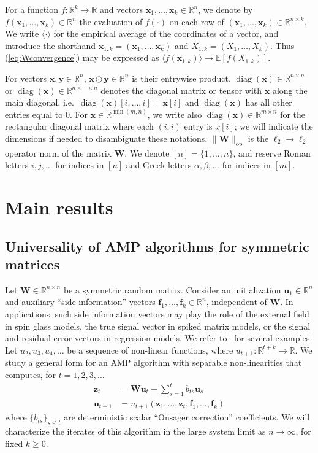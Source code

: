 \documentclass[10pt,reqno]{amsart}
\def\u{\mathbf{u}}
\def\x{\mathbf{x}}
\def\y{\mathbf{y}}
\def\z{\mathbf{z}}
\def\f{\mathbf{f}}
\def\W{\mathbf{W}}
\def\E{\mathbb{E}}
\def\R{\mathbb{R}}
\def\diag{\operatorname{diag}}
\def\op{\mathrm{op}}
\begin{document}
For a function $f:\R^k \to \R$ and vectors $\x_1,\ldots,\x_k \in
\R^n$, we denote by $f(\x_1,\ldots,\x_k) \in \R^n$ the evaluation of $f(\cdot)$
on each row of $(\x_1,\ldots,\x_k) \in \R^{n \times k}$.
We write $\langle \cdot \rangle$ for the
empirical average of the coordinates of a vector, and introduce the shorthand
$\x_{1:k}=(\x_1,\ldots,\x_k)$ and $X_{1:k}=(X_1,\ldots,X_k)$. Thus
(\ref{eq:Wconvergence}) may be expressed as
$\langle f(\x_{1:k}) \rangle \to \E[f(X_{1:k})]$.

For vectors $\x,\y \in \R^n$, $\x \odot \y \in \R^n$ is their entrywise
product. $\diag(\x) \in \R^{n \times n}$ or $\diag(\x) \in \R^{n \times \cdots
\times n}$ denotes the diagonal matrix or tensor with $\x$ along the main
diagonal, i.e.\ $\diag(\x)[i,\ldots,i] = \x[i]$ and $\diag(\x)$ has all
other entries equal to 0.
For $\x \in \R^{\min(m,n)}$, we write also $\diag(\x) \in
\R^{m \times n}$ for the rectangular diagonal matrix where each $(i,i)$ entry
is $x[i]$; we will indicate the dimensions if needed to disambiguate these
notations. $\|\W\|_\op$ is the $\ell_2 \to \ell_2$ operator norm of the matrix
$\W$. We denote $[n]=\{1,\ldots,n\}$, and reserve Roman letters
$i,j,\ldots$ for indices in $[n]$ and Greek letters
$\alpha,\beta,\ldots$ for indices in $[m]$.


\section{Main results}\label{sec:result}

\subsection{Universality of AMP algorithms for symmetric matrices}\label{sec:result_sym}

Let $\W \in \R^{n \times n}$ be a symmetric random matrix. Consider an
initialization $\u_1 \in \R^n$ and auxiliary ``side information'' vectors
$\f_1,\ldots,\f_k \in \R^n$, independent of $\W$. In applications, such side information
vectors may play the role of the external
field in spin glass models, the true signal vector in spiked matrix models, or
the signal and residual error vectors in regression models. We refer
to~\cite{bayati2011dynamics,rangan2011generalized,rangan2012iterative} for
several examples. Let $u_2,u_3,u_4,\ldots$ be a
sequence of non-linear functions, where $u_{t+1}:\R^{t+k} \to \R$.
We study a general form for an AMP algorithm with separable non-linearities
that computes, for $t=1,2,3,\ldots$
\begin{subequations}
\label{eq:AMP}
\begin{align}
\z_t&=\W\u_t-\sum_{s=1}^t b_{ts}\u_s \label{eq:AMPz}\\
\u_{t+1}&=u_{t+1}(\z_1,\ldots,\z_t,\f_1,\ldots,\f_k)\label{eq:AMPu} 
\end{align}
\end{subequations}
where $\{b_{ts}\}_{s \leq t}$ are deterministic scalar ``Onsager correction''
coefficients. We will characterize the iterates of this algorithm in the large
system limit as $n \to \infty$, for fixed $k \geq 0$.
\end{document}
